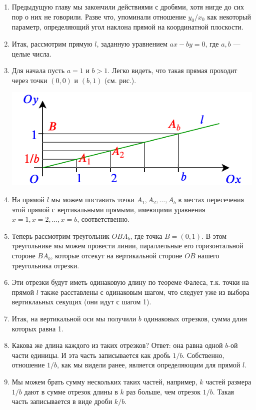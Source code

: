 \begin{enumerate}
\item Предыдущую главу мы закончили действиями с дробями, хотя нигде до сих пор о них не говорили. Разве что, упоминали отношение $y_0/x_0$ как некоторый параметр, определяющий угол наклона прямой на координатной плоскости.
\item Итак, рассмотрим прямую $l$, заданную уравнением $ax-by=0$, где $a,b$ --- целые числа.
\item Для начала пусть $a=1$ и $b>1$. Легко видеть, что такая прямая проходит через точки $(0,0)$ и $(b,1)$ (см. рис.).
\begin{center}
\includegraphics[scale=0.5]{section.png}
\end{center}
\item На прямой $l$ мы можем поставить точки $A_1, A_2, \dots, A_b$ в местах пересечения этой прямой с вертикальными прямыми, имеющими уравнения $x=1, x=2, \dots, x=b$, соответственно.
\item Теперь рассмотрим треугольник $OBA_b$, где точка $B=(0,1)$. В этом треугольнике мы можем провести линии, параллельные его горизонтальной стороне $BA_b$, которые отсекут на вертикальной стороне $OB$ нашего треугольника отрезки.
\item Эти отрезки будут иметь одинаковую длину по теореме Фалеса, т.к. точки на прямой $l$ также расставлены с одинаковым шагом, что следует уже из выбора вертиклаьных секущих (они идут с шагом 1).
\item Итак, на вертикальной оси мы получили $b$ одинаковых отрезков, сумма длин которых равна 1.
\item Какова же длина каждого из таких отрезков? Ответ: она равна одной $b$-ой части единицы. И эта часть записывается как дробь $1/b$. Собственно, отношение $1/b$, как мы видели ранее, является определяющим для прямой $l$.
\item Мы можем брать сумму нескольких таких частей, например, $k$ частей размера $1/b$ дают в сумме отрезок длины в $k$ раз больше, чем отрезок $1/b$. Такая часть записывается в виде дроби $k/b$.

\end{enumerate}
